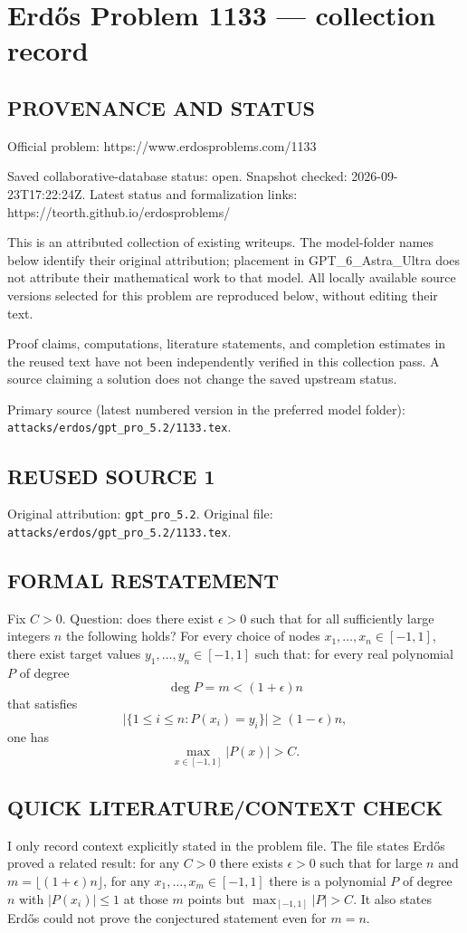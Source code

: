 \section*{Erd\H{o}s Problem 1133 --- collection record}

\subsection*{PROVENANCE AND STATUS}
Official problem: https://www.erdosproblems.com/1133

Saved collaborative-database status: open.
Snapshot checked: 2026-09-23T17:22:24Z.
Latest status and formalization links: https://teorth.github.io/erdosproblems/

This is an attributed collection of existing writeups. The model-folder names below identify their original attribution; placement in GPT\_6\_Astra\_Ultra does not attribute their mathematical work to that model. All locally available source versions selected for this problem are reproduced below, without editing their text.

Proof claims, computations, literature statements, and completion estimates in the reused text have not been independently verified in this collection pass. A source claiming a solution does not change the saved upstream status.

Primary source (latest numbered version in the preferred model folder): \texttt{attacks/erdos/gpt\_pro\_5.2/1133.tex}.

\subsection*{REUSED SOURCE 1}
Original attribution: \texttt{gpt\_pro\_5.2}.
Original file: \texttt{attacks/erdos/gpt\_pro\_5.2/1133.tex}.


\subsection*{FORMAL RESTATEMENT}
Fix $C>0$.
Question: does there exist $\epsilon>0$ such that for all sufficiently large integers $n$ the following holds?
For every choice of nodes $x_1,\dots,x_n\in[-1,1]$, there exist target values $y_1,\dots,y_n\in[-1,1]$ such that:
for every real polynomial $P$ of degree
\[
\deg P = m < (1+\epsilon)n
\]
that satisfies
\[
\lvert\{1\le i\le n: P(x_i)=y_i\}\rvert\ge (1-\epsilon)n,
\]
one has
\[
\max_{x\in[-1,1]} |P(x)|>C.
\]

\subsection*{QUICK LITERATURE/CONTEXT CHECK}
I only record context explicitly stated in the problem file.
The file states Erd\H{o}s proved a related result: for any $C>0$ there exists $\epsilon>0$ such that for large $n$ and $m=\lfloor(1+\epsilon)n\rfloor$, for any $x_1,\dots,x_m\in[-1,1]$ there is a polynomial $P$ of degree $n$ with $|P(x_i)|\le 1$ at those $m$ points but $\max_{[-1,1]}|P|>C$.
It also states Erd\H{o}s could not prove the conjectured statement even for $m=n$.


